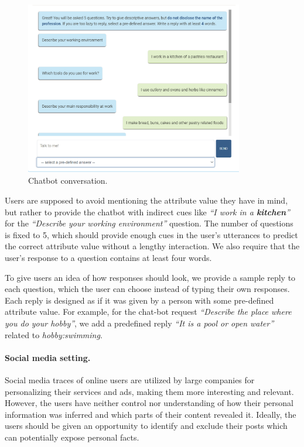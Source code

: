 \begin{figure}[th!]
\centering
\includegraphics[width=0.85\textwidth]{imgs/conv-baker.png}
\vspace*{-0.3cm}
\caption{Chatbot conversation.}
\label{conv}
\end{figure}

Users are supposed to avoid mentioning the attribute value they have in mind, but rather to provide the chatbot with indirect cues like \emph{``I work in a \textbf{kitchen}''} for the \emph{``Describe your working environment''} question. The number of questions is fixed to 5, which should provide enough cues in the user's utterances to predict the correct attribute value without a lengthy interaction. We also require that the user's response to a question contains at least four words. 

To give users an idea of how responses should look, we provide a sample reply to each question, which the user can choose instead of typing their own responses. Each reply is designed as if it was given by a person with some pre-defined attribute value. For example, for the chat-bot request \textit{``Describe the place where you do your hobby''}, we add a predefined reply \textit{``It is a pool or open water''} related to \textit{hobby:swimming}. 

\paragraph{Social media setting.} 
Social media traces of online users are utilized by large companies for personalizing their services and ads, making them more interesting and relevant. However, the users have neither control nor understanding of how their personal information was inferred and which parts of their content revealed it. Ideally, the users should be given an opportunity to identify and exclude their posts which can potentially expose personal facts. 

